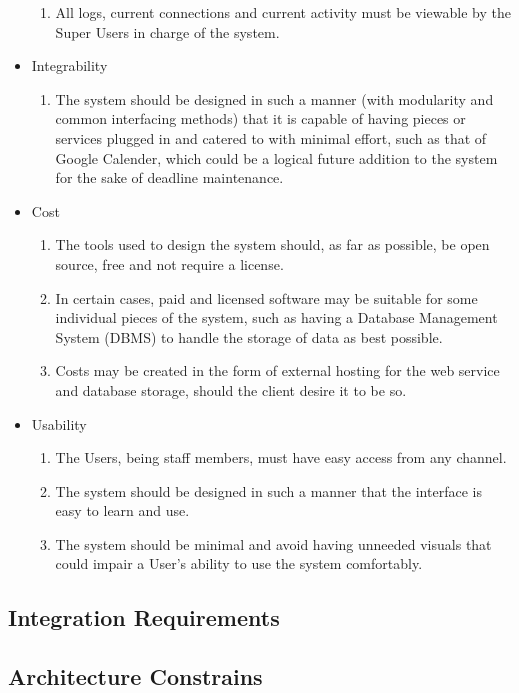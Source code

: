 \documentclass[hidelinks,a4paper,12pt]{article}
\begin{document}
\begin{itemize}
\begin{enumerate}
		\item All logs, current connections and current activity must be viewable by the Super Users in charge of the system.
	\end{enumerate}
	\item Integrability
	\begin{enumerate}
		\item The system should be designed in such a manner (with modularity and common interfacing methods) that it is capable of having pieces or services plugged in and catered to with minimal effort, such as that of Google Calender, which could be a logical future addition to the system for the sake of deadline maintenance.
	\end{enumerate}
	\item Cost
	\begin{enumerate}
		\item The tools used to design the system should, as far as possible, be open source, free and not require a license.
		\item In certain cases, paid and licensed software may be suitable for some individual pieces of the system, such as having a Database Management System (DBMS) to handle the storage of data as best possible.
		\item Costs may be created in the form of external hosting for the web service and database storage, should the client desire it to be so.
	\end{enumerate}
	\item Usability
	\begin{enumerate}
		\item The Users, being staff members, must have easy access from any channel.
		\item The system should be designed in such a manner that the interface is easy to learn and use.
		\item The system should be minimal and avoid having unneeded visuals that could impair a User's ability to use the system comfortably.
	\end{enumerate}
\end{itemize}

		
\subsection{Integration Requirements}

\subsection{Architecture Constrains}
\end{document}
